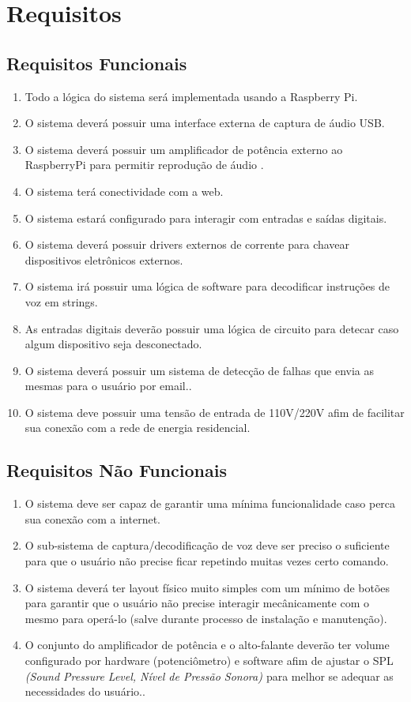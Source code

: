 \section{Requisitos}

\subsection{Requisitos Funcionais}
\begin{enumerate}
  \item Todo a lógica do sistema será implementada usando a Raspberry Pi.
  \item O sistema deverá possuir uma interface externa de captura de áudio USB.
  \item O sistema deverá possuir um amplificador de potência externo ao RaspberryPi para permitir reprodução de áudio \cite{haro2014low}.
  \item O sistema terá conectividade com a web.
  \item O sistema estará configurado para interagir com entradas e saídas digitais.
  \item O sistema deverá possuir drivers externos de corrente para chavear dispositivos eletrônicos externos.
  \item O sistema irá possuir uma lógica de software para decodificar instruções de voz em strings.
  \item As entradas digitais deverão possuir uma lógica de circuito para detecar caso algum dispositivo seja desconectado.
  \item O sistema deverá possuir um sistema de detecção de falhas que envia as mesmas para o usuário por email..
  \item O sistema deve possuir uma tensão de entrada de 110V/220V afim de facilitar sua conexão com a rede de energia residencial.
\end{enumerate}

\subsection{Requisitos Não Funcionais}
\begin{enumerate}
  \item O sistema deve ser capaz de garantir uma mínima funcionalidade caso perca sua conexão com a internet.
  \item O sub-sistema de captura/decodificação de voz deve ser preciso o suficiente para que o usuário não precise ficar repetindo muitas vezes certo comando.
  \item O sistema deverá ter layout físico muito simples com um mínimo de botões para garantir que o usuário não precise interagir mecânicamente com o mesmo para operá-lo (salve durante processo de instalação e manutenção).
  \item O conjunto do amplificador de potência e o alto-falante deverão ter volume configurado por hardware (potenciômetro) e software afim de ajustar o SPL \textit{(Sound Pressure Level, Nível de Pressão Sonora) \cite{spl}} para melhor se adequar as necessidades do usuário..
\end{enumerate}
